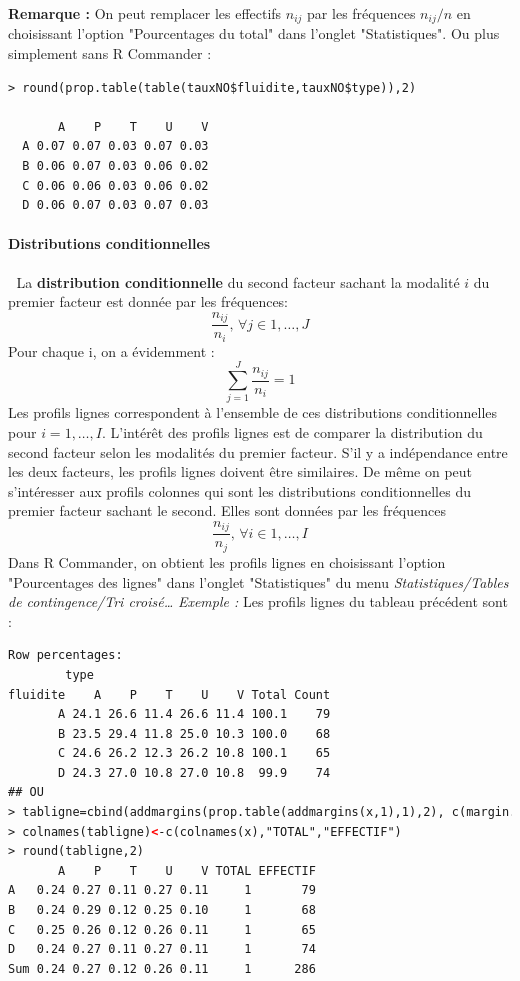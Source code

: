 \textbf{Remarque :} On peut remplacer les effectifs $n_{ij}$ par les fréquences $n_{ij}/n$ en choisissant l'option "Pourcentages du total" dans l'onglet "Statistiques".
Ou plus simplement sans R Commander : 
\begin{lstlisting}[language=html]
> round(prop.table(table(tauxNO$fluidite,tauxNO$type)),2)
   
       A    P    T    U    V
  A 0.07 0.07 0.03 0.07 0.03
  B 0.06 0.07 0.03 0.06 0.02
  C 0.06 0.06 0.03 0.06 0.02
  D 0.06 0.07 0.03 0.07 0.03
\end{lstlisting}
\paragraph{Distributions conditionnelles}\textcolor{white}{.}\newline
La \textbf{distribution conditionnelle} du second facteur sachant la modalité $i$ du premier facteur est donnée par les fréquences:
$$\frac{n_{ij}}{n_{i}} \textrm{, }\forall j \in 1,\dots,J$$
Pour chaque i, on a évidemment :
$$\sum_{j=1}^{J}\frac{n_{ij}}{n_{i}} = 1$$
Les profils lignes correspondent à l'ensemble de ces distributions
conditionnelles pour $i=1,\dots,I$.\newline
L'intérêt des profils lignes est de comparer la distribution du second facteur selon les modalités du premier facteur. S'il y a indépendance entre les deux facteurs, les profils lignes doivent être similaires.
De même on peut s'intéresser aux profils colonnes qui sont les distributions conditionnelles du premier facteur sachant le second. Elles sont données par les fréquences
$$\frac{n_{ij}}{n_{j}} \textrm{, }\forall i \in 1,\dots,I$$
Dans R Commander, on obtient les profils lignes en choisissant l'option
"Pourcentages des lignes" dans l'onglet "Statistiques" du menu
\textit{Statistiques/Tables de contingence/Tri croisé\dots}\newline
\textit{Exemple : } Les profils lignes du tableau précédent sont :
\begin{lstlisting}[language=html]
Row percentages:
        type
fluidite    A    P    T    U    V Total Count
       A 24.1 26.6 11.4 26.6 11.4 100.1    79
       B 23.5 29.4 11.8 25.0 10.3 100.0    68
       C 24.6 26.2 12.3 26.2 10.8 100.1    65
       D 24.3 27.0 10.8 27.0 10.8  99.9    74
## OU
> tabligne=cbind(addmargins(prop.table(addmargins(x,1),1),2), c(margin.table(x,1),sum(x)))
> colnames(tabligne)<-c(colnames(x),"TOTAL","EFFECTIF")
> round(tabligne,2)
       A    P    T    U    V TOTAL EFFECTIF
A   0.24 0.27 0.11 0.27 0.11     1       79
B   0.24 0.29 0.12 0.25 0.10     1       68
C   0.25 0.26 0.12 0.26 0.11     1       65
D   0.24 0.27 0.11 0.27 0.11     1       74
Sum 0.24 0.27 0.12 0.26 0.11     1      286
\end{lstlisting}
